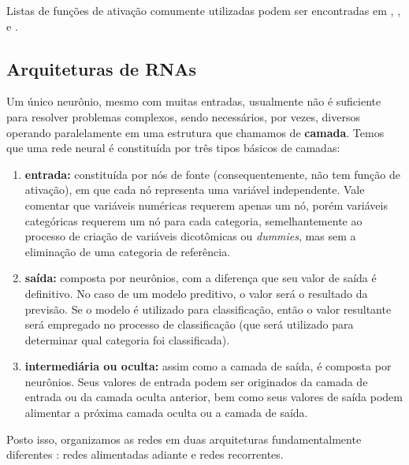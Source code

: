 \documentclass[twoside]{automatextcc}
\begin{document}
Listas de funções de ativação comumente utilizadas podem ser encontradas em \citet{hastie2008}, \citet{hagan2014}, \citet{aggarwal2018} e \citet{dsa2022}.



\subsection{Arquiteturas de RNAs}
\label{arquitetura rna}

Um único neurônio, mesmo com muitas entradas, usualmente não é suficiente para resolver problemas complexos, sendo necessários, por vezes, diversos operando paralelamente em uma estrutura que chamamos de \textbf{camada}. Temos que uma rede neural é constituída por três tipos básicos de camadas:

\begin{enumerate}
    \item \textbf{entrada:} constituída por nós de fonte (consequentemente, não tem função de ativação), em que cada nó representa uma variável independente. Vale comentar que variáveis numéricas requerem apenas um nó, porém variáveis categóricas requerem um nó para cada categoria, semelhantemente ao processo de criação de variáveis dicotômicas ou \textit{dummies}, mas sem a eliminação de uma categoria de referência.
    \item \textbf{saída:} composta por neurônios, com a diferença que seu valor de saída é definitivo. No caso de um modelo preditivo, o valor será o resultado da previsão. Se o modelo é utilizado para classificação, então o valor resultante será empregado no processo de classificação (que será utilizado para determinar qual categoria foi classificada).
    \item \textbf{intermediária ou oculta:} assim como a camada de saída, é composta por neurônios. Seus valores de entrada podem ser originados da camada de entrada ou da camada oculta anterior, bem como seus valores de saída podem alimentar a próxima camada oculta ou a camada de saída.
\end{enumerate}
Posto isso, organizamos as redes em duas arquiteturas fundamentalmente diferentes \citep{hair2005,haykin2009,hagan2014}: redes alimentadas adiante e redes recorrentes.
\end{document}
